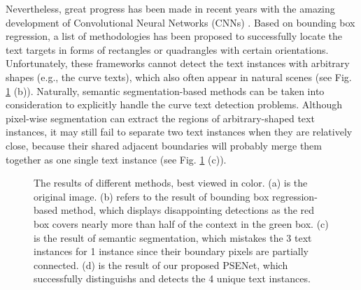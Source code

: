 \documentclass{article}
\begin{document}
Nevertheless, great progress has been made in recent years with the amazing development of Convolutional Neural Networks (CNNs) \cite{he2016deep,huang2017densely,ren2015faster}. Based on bounding box regression, a list of methodologies \cite{tian2016detecting, zhou2017east, shi2017detecting, jiang2017r2cnn, zhong2016deeptext, liu2018fots, he2017single, hu2017wordsup, lyu2018multi} has been proposed to successfully locate the text targets in forms of rectangles or quadrangles with certain orientations. Unfortunately, these frameworks cannot detect the text instances with arbitrary shapes (e.g., the curve texts), which also often appear in natural scenes (see Fig. \ref{fig:diff-meth-res} (b)). Naturally,
semantic segmentation-based methods can be taken into consideration to explicitly handle the curve text detection problems. Although pixel-wise segmentation can extract the regions of arbitrary-shaped text instances, it may still fail to separate two text instances when they are relatively close, because their shared adjacent boundaries will probably merge them together as one single text instance (see Fig. \ref{fig:diff-meth-res} (c)).


\begin{figure}
	\centering
	\setlength{\fboxrule}{0pt}
	\vspace{-14pt}
	\caption{The results of different methods, best viewed in color. (a) is the original image. (b) refers to the result of bounding box regression-based method, which displays disappointing detections as the red box covers nearly more than half of the context in the green box. (c) is the result of semantic segmentation, which mistakes the 3 text instances for 1 instance since their boundary pixels are partially connected. (d) is the result of our proposed PSENet, which successfully distinguishs and detects the 4 unique text instances.}
	\label{fig:diff-meth-res}
  \vspace{-8pt}
\end{figure}
\end{document}
